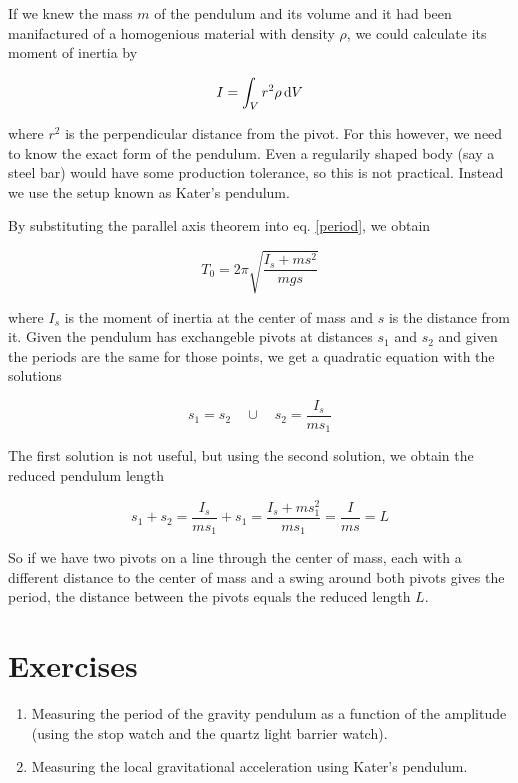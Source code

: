 \documentclass[a4paper,german,12pt,smallheadings]{scrartcl}
\begin{document}
If we knew the mass $m$ of the pendulum and its volume and it had been
manifactured of a homogenious material with density $\rho$, we could calculate
its moment of inertia by

\begin{equation}
  I = \int_V r^2 \rho \dif V
\end{equation}

where $r^2$ is the perpendicular distance from the pivot. For this however, we
need to know the exact form of the pendulum. Even a regularily shaped body (say
a steel bar) would have some production tolerance, so this is not practical.
Instead we use the setup known as Kater's pendulum.

By substituting the parallel axis theorem into eq. \ref{period}, we obtain

\begin{equation}
  T_{0} = 2 \pi \sqrt{\frac{I_s + ms^2}{mgs}}
\end{equation}

where $I_s$ is the moment of inertia at the center of mass and $s$ is the
distance from it. Given the pendulum has exchangeble pivots at distances $s_1$
and $s_2$ and given the periods are the same for those points, we get a
quadratic equation with the solutions

\begin{equation}
  s_1 = s_2 \quad \cup \quad s_2 = \frac{I_s}{m s_1}
\end{equation}

The first solution is not useful, but using the second solution, we obtain the
reduced pendulum length

\begin{equation}
  s_1 + s_2 = \frac{I_s}{ms_1} + s_1 = \frac{I_s + ms_1^2}{ms_1} = \frac{I}{ms} = L
\end{equation}

So if we have two pivots on a line through the center of mass, each with a
different distance to the center of mass and a swing around both pivots gives
the period, the distance between the pivots equals the reduced length $L$.

\section*{Exercises}
\begin{enumerate}
  \item Measuring the period of the gravity pendulum as a function of the
    amplitude (using the stop watch and the quartz light barrier watch).
  \item Measuring the local gravitational acceleration using Kater's pendulum.
\end{enumerate}
\newpage
\end{document}
